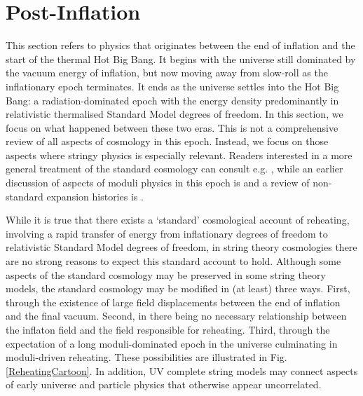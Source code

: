 \newpage

\startdocument

\section{Post-Inflation}
\label{reheating}


This section refers to physics that originates between the end of inflation and the start of the thermal Hot Big Bang. It begins with the universe still dominated by the vacuum energy of inflation, but now moving away from slow-roll as the inflationary epoch terminates. It ends as the universe settles into the Hot Big Bang: a radiation-dominated epoch with the energy density predominantly in relativistic thermalised Standard Model degrees of freedom. In this section, we focus on what happened between these two eras. This is not a comprehensive review of all aspects of cosmology in this epoch. Instead, we focus on those aspects where stringy physics is especially relevant. Readers interested in a more general treatment of the standard cosmology can consult e.g. \cite{Kolb:1990vq, Baumann:2022mni}, while an earlier discussion of aspects of moduli physics in this epoch is \cite{150207746} and a review of non-standard expansion histories is \cite{Allahverdi:2020bys}.
 
 While it is true that there exists a `standard' cosmological account of reheating, involving a rapid transfer of energy from inflationary degrees of freedom to relativistic Standard Model degrees of freedom, in string theory cosmologies there are no strong reasons to expect this standard account to hold. Although some aspects of the standard cosmology may be preserved in some string theory models, the standard cosmology may be modified in (at least) three ways. First, through the existence of large field displacements between the end of inflation and the final vacuum. Second, in there being no necessary relationship between the inflaton field and the field responsible for reheating. Third, through the expectation of a long moduli-dominated epoch in the universe culminating in moduli-driven reheating. These possibilities are illustrated in Fig. \ref{ReheatingCartoon}. In addition, UV complete string models may connect aspects of early universe and particle physics that otherwise appear uncorrelated.
 
